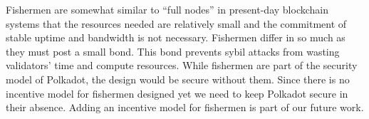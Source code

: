 \documentclass{article}
\begin{document}

Fishermen are somewhat similar to “full nodes” in present-day blockchain systems that the resources needed are relatively small and the commitment of stable uptime and bandwidth is not necessary. Fishermen differ in so much as they must post a small bond. This bond prevents sybil attacks from wasting validators’ time and compute resources. %
While fishermen are part of the security model of Polkadot, the design would be secure without them. Since there is no incentive model for fishermen designed yet we need to keep Polkadot secure in their absence. Adding an incentive model for fishermen is part of our future work.  
\end{document}
